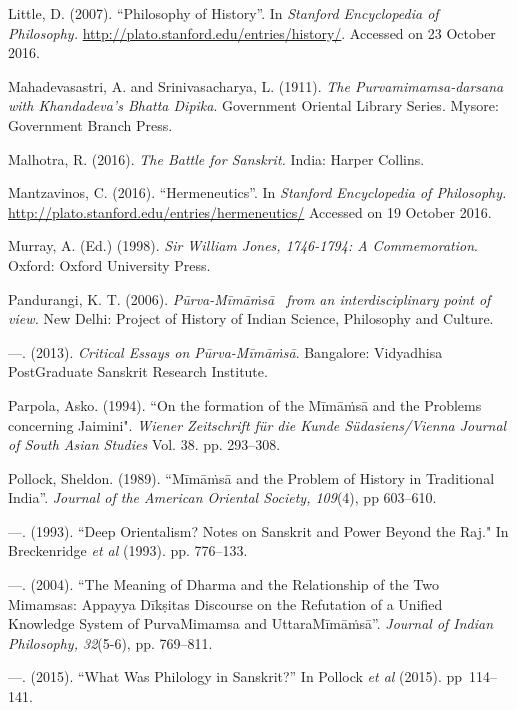 \begin{thebibliography}{99}
  Little, D. (2007). “Philosophy of History”. In \textit{Stanford Encyclopedia of Philosophy.} \url{http://plato.stanford.edu/entries/history/}. Accessed on 23 October 2016.

  Mahadevasastri, A. and Srinivasacharya, L. (1911). \textit{The Purvamimamsa-darsana with Khandadeva's Bhatta Dipika}. Government Oriental Library Series. Mysore: Government Branch Press.

  Malhotra, R. (2016). \textit{The Battle for Sanskrit.} India: Harper Collins.

  Mantzavinos, C. (2016). “Hermeneutics”. In \textit{Stanford Encyclopedia of Philosophy.} \url{http://plato.stanford.edu/entries/hermeneutics/} Accessed on 19 October 2016.

  Murray, A. (Ed.) (1998). \textit{Sir William Jones, 1746-1794: A Commemoration}. Oxford: Oxford University Press.

  Pandurangi, K. T. (2006). \textit{Pūrva-Mīmāṁsā  from an interdisciplinary point of view.} New Delhi: Project of History of Indian Science, Philosophy and Culture.

  —. (2013). \textit{Critical Essays on Pūrva-Mīmāṁsā}. Bangalore: Vidyadhisa PostGraduate Sanskrit Research Institute.

  Parpola, Asko. (1994). ``On the formation of the Mīmāṁsā and the Problems concerning Jaimini". \textit{Wiener Zeitschrift für die Kunde Südasiens/Vienna Journal of South Asian Studies} Vol. 38. pp. 293--308.

  Pollock, Sheldon. (1989). “Mīmāṁsā and the Problem of History in Traditional India”. \textit{Journal of the American Oriental Society, 109}(4), pp 603--610.

  —. (1993). ``Deep Orientalism? Notes on Sanskrit and Power Beyond the Raj." In Breckenridge \textit{et al} (1993). pp. 776--133.

  —. (2004). “The Meaning of Dharma and the Relationship of the Two Mimamsas: Appayya Dīkṣitas Discourse on the Refutation of a Unified Knowledge System of PurvaMimamsa and UttaraMīmāṁsā”. \textit{Journal of Indian Philosophy, 32}(5-6), pp. 769--811.

  —. (2015). “What Was Philology in Sanskrit?” In Pollock \textit{et al} (2015). pp~114--141.


\end{thebibliography}
